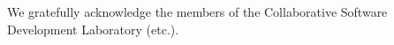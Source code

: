 \documentclass[smallextended]{svjour3}     %
\begin{document}
\begin{acknowledgements}
We gratefully acknowledge the members of the Collaborative Software Development Laboratory (etc.).
\end{acknowledgements}


\end{document}
